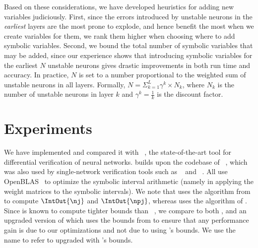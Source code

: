 Based on these considerations, we have developed heuristics for adding
new variables judiciously.
%
First, since the errors introduced by unstable neurons in
the \emph{earliest} layers are the most prone to explode, and hence
benefit the most when we create variables for them, we
rank them higher when choosing where to add symbolic variables.
%
Second, we bound the total number of symbolic variables that may be
added, since our experience shows that introducing symbolic variables
for the earliest $ N $ unstable neurons gives drastic improvements in
both run time and accuracy.
%
In practice, $N$ is set to a number proportional
to the weighted sum of unstable neurons in all layers. Formally,
$N=\Sigma_{k=1}^L \gamma^k \times N_k$, where $N_k$ is the number of
unstable neurons in layer $k$ and $\gamma^k = \frac{1}{k}$ is the discount
factor.
%



\section{Experiments}
\label{neurodiff:sec:experiment}


We have implemented \Name{} and compared it
with \ReluDiff{}~\cite{PaulsenWW20}, the state-of-the-art tool for
differential verification of neural networks.
%
\Name{} builds upon the codebase of \ReluDiff{}~\cite{reludiffrepo},
which was also used by single-network verification tools such
as \ReluVal{}~\cite{WangPWYJ18} and \Neurify{}~\cite{WangPWYJ18nips}.
All use OpenBLAS~\cite{ZhangWZ12} to optimize the symbolic
interval arithmetic (namely in applying the weight matrices to the
symbolic intervals).
%
We note that \Name{} uses the algorithm from \Neurify{} to compute
$ \IntOut{\nj} $ and $ \IntOut{\npj} $, whereas \ReluDiff{} uses
the algorithm of \ReluVal{}. Since \Neurify{} is known to compute
tighter bounds than \ReluVal{}~\cite{WangPWYJ18nips},
we compare to both \ReluDiff{}, and an upgraded version of \ReluDiff{}
which uses the bounds from \Neurify{} to ensure
that any performance gain is due to our optimizations and not due to
using \Neurify{}'s bounds. We use the name \ReluDiffP{} to refer
to \ReluDiff{} upgraded with \Neurify{}'s bounds.
%


